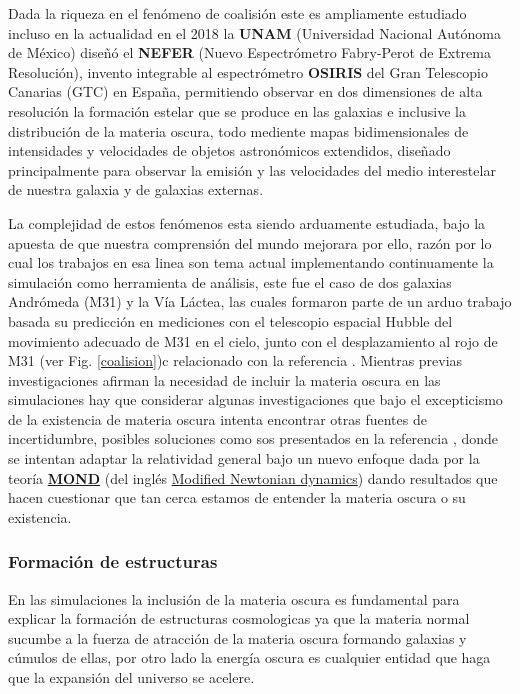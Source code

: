 Dada la riqueza en el fenómeno de coalisión este es ampliamente estudiado incluso en la actualidad en el 2018 la \textbf{UNAM} (Universidad Nacional Autónoma de México) diseñó el \textbf{NEFER} (Nuevo Espectrómetro Fabry-Perot de Extrema Resolución), invento integrable al espectrómetro \textbf{OSIRIS} del Gran Telescopio Canarias (GTC) en España, permitiendo observar en dos dimensiones de alta resolución la formación estelar que se produce en las galaxias e inclusive la distribución de la materia oscura, todo mediente mapas bidimensionales de intensidades y velocidades de objetos astronómicos extendidos, diseñado principalmente para observar la emisión y las velocidades del medio interestelar de nuestra galaxia y de galaxias externas.

La complejidad de estos fenómenos esta siendo arduamente estudiada, bajo la apuesta de que nuestra comprensión del mundo mejorara por ello, razón por lo cual los trabajos en esa linea son tema actual implementando continuamente la simulación como herramienta de análisis, este fue el caso de dos galaxias Andrómeda (M31) y la Vía Láctea, las cuales formaron parte de un arduo trabajo basada su predicción en mediciones con el telescopio espacial Hubble del movimiento adecuado de M31 en el cielo, junto con el desplazamiento al rojo de M31 (ver Fig. \ref{coalision})c relacionado con la referencia \cite{van_der_marel_m31_2012}. Mientras previas investigaciones afirman la necesidad de incluir la materia oscura en las simulaciones hay que considerar algunas investigaciones que bajo el excepticismo de la existencia de materia oscura intenta encontrar otras fuentes de incertidumbre, posibles soluciones como sos presentados en la referencia \cite{bilek_mond_2018}, donde se intentan adaptar la relatividad general bajo un nuevo enfoque dada por la teoría \href{https://en.wikipedia.org/wiki/Modified_Newtonian_dynamics}{\textbf{MOND}} (del inglés \href{https://en.wikipedia.org/wiki/Modified_Newtonian_dynamics}{Modified Newtonian dynamics}) dando resultados que hacen cuestionar que tan cerca estamos de entender la materia oscura o su existencia.


\subsubsection{Formación de estructuras}

En las simulaciones la inclusión de la materia oscura es fundamental para explicar la formación de estructuras cosmologicas ya que la materia normal sucumbe a la fuerza de atracción de la materia oscura formando galaxias y cúmulos de ellas, por otro lado la energía oscura es cualquier entidad que haga que la expansión del universo se acelere.

